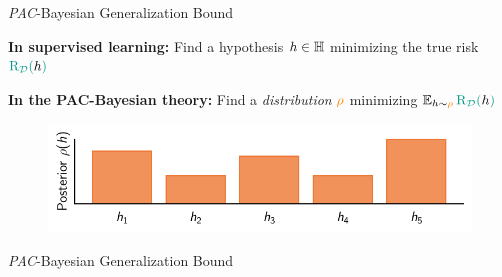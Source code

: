 \documentclass{slides}
\begin{document}
\begin{xframe}{{\it PAC}-Bayesian Generalization Bound}

  \vspace{-0.5cm}

  \begin{xblock}{}
  {\bf In supervised learning:} Find a hypothesis $\textcolor{black}{h}\in\mathbb{H}$ minimizing the true risk $\green{\Risk_{\D}(\black{\h})}$
  \end{xblock}
  
  \vspace{-0.1cm}
  
  \begin{figure}
   \centering
   
  \end{figure}

  \vspace{-0.3cm}

  \begin{redbox}{}
  {\bf In the PAC-Bayesian theory:} Find a {\it distribution} $\textcolor{orange}{\rho}$ minimizing $\EE_{\h\sim\Q}\green{\Risk_{\D}(\black{\h})}$
  \end{redbox}

  \vspace{-0.3cm}

  \begin{figure}
   \centering
   \includegraphics[width=0.8\linewidth]{figures/distribution_post.pdf}
  \end{figure}

\end{xframe}


\begin{xframe}{{\it PAC}-Bayesian Generalization Bound}

  \vfill

  \begin{figure}
  
  \end{figure}
  
  \vfill

\end{xframe}
\end{document}
